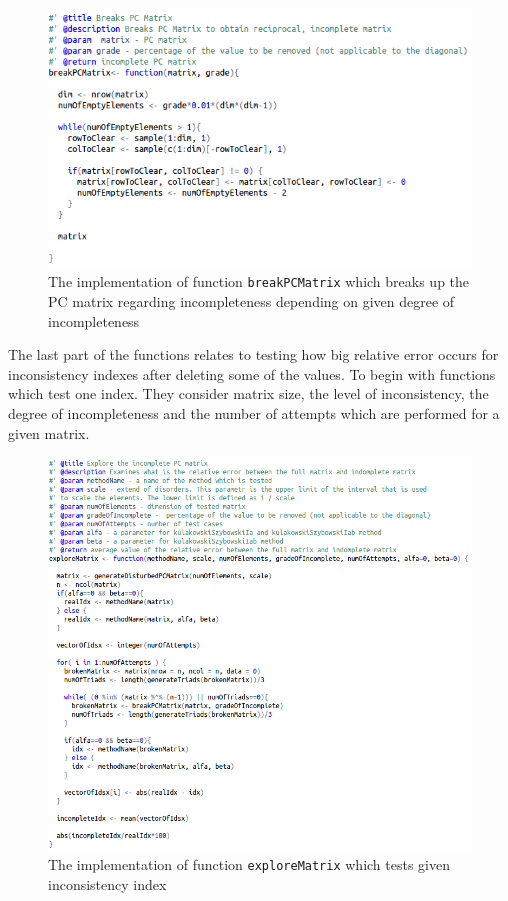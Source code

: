 \begin{figure}[h]
\centerline{\includegraphics[scale=0.73]{images/kod13.png}}
\caption{The implementation of function \texttt{breakPCMatrix} which breaks up the PC matrix regarding incompleteness depending on given degree of incompleteness}
\label{fig:rstudio}
\end{figure}

The last part of the functions relates to testing how big relative error occurs for inconsistency indexes after deleting some of the values. To begin with functions which test one index. They consider matrix size, the level of inconsistency, the degree of incompleteness and the number of attempts which are performed for a given matrix.

\begin{figure}[h]
\centerline{\includegraphics[scale=0.58]{images/kod21.png}}
\caption{The implementation of function \texttt{exploreMatrix} which tests given inconsistency index}
\label{fig:rstudio}
\end{figure}

